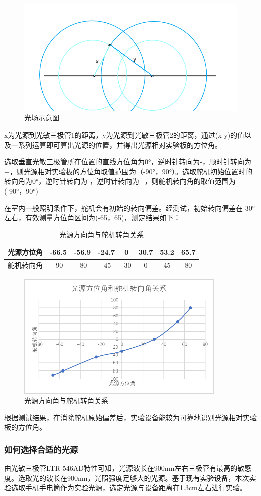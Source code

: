 \begin{figure}[H]
\centering
\includegraphics[width=12cm]{figure/1.2.1.png}
\caption{光场示意图} \label{fig:1.2.1}
\end{figure}

\par{x为光源到光敏三极管1的距离，y为光源到光敏三极管2的距离，通过(x-y)的值以及一系列运算即可算出光源的位置，并得出光源相对实验板的方位角。}
\par{选取垂直光敏三极管所在位置的直线方位角为0°，逆时针转向为-，顺时针转向为+，则光源相对实验板的方位角取值范围为（-90°，90°）。选取舵机初始位置时的转向角为0°，逆时针转向为-，逆时针转向为+，则舵机转向角的取值范围为(-90°，90°)}
\par{在室内一般照明条件下，舵机会有初始的转向偏差。经测试，初始转向偏差在-30°左右，有效测量方位角区间为(-65，65)，测定结果如下：}

\begin{table}[h]
	\centering
	\begin{tabular}{c|ccccccc}
        光源方位角&-66.5&-56.9&-24.7&0&30.7&53.2&65.7\\
        \hline
        舵机转向角&-90&-80&-45&-30&0&45&80\\
	\end{tabular}
	\caption{光源方向角与舵机转角关系}
	\label{tab:1.3}
\end{table}

\begin{figure}[H]
\centering
\includegraphics[width=10cm]{figure/1.4.1.png}
\caption{光源方向角与舵机转角关系} \label{fig:1.4.1}
\end{figure}

\par{根据测试结果，在消除舵机原始偏差后，实验设备能较为可靠地识别光源相对实验板的方位角。}

\subsubsection{如何选择合适的光源}
\par{由光敏三极管LTR-546AD特性可知，光源波长在900nm左右三极管有最高的敏感度。选取光的波长在900nm，光照强度足够大的光源。基于现有实验设备，本次实验选取手机手电筒作为实验光源，选定光源与设备距离在1.3cm左右进行实验。}

